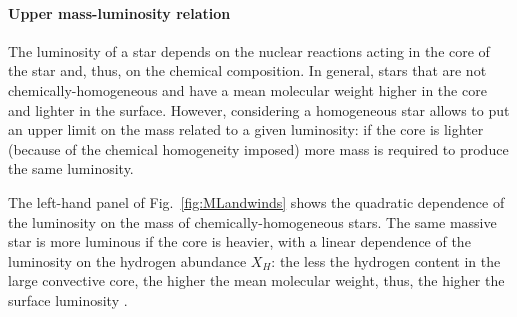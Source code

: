 \documentclass[a4paper,titlepage]{book}     	%
\begin{document}
\paragraph{Upper mass-luminosity relation} The luminosity of a star depends on the nuclear reactions acting in the core of the star and, thus, on the chemical composition. In general, stars that are not chemically-homogeneous and have a mean molecular weight higher in the core and lighter in the surface. However, considering a homogeneous star allows to put an upper limit on the mass related to a given luminosity: if the core is lighter (because of the chemical homogeneity imposed) more mass is required to produce the same luminosity. 

The left-hand panel of Fig.\ \ref{fig:MLandwinds} shows the quadratic dependence of the luminosity on the mass of chemically-homogeneous stars. The same massive star is more luminous if the core is heavier, with a linear dependence of the luminosity on the hydrogen abundance $X_H$: the less the hydrogen content in the large convective core, the higher the mean molecular weight, thus, the higher the surface luminosity \cite{Grafener2011_M-L_WR}.
 
\end{document}
